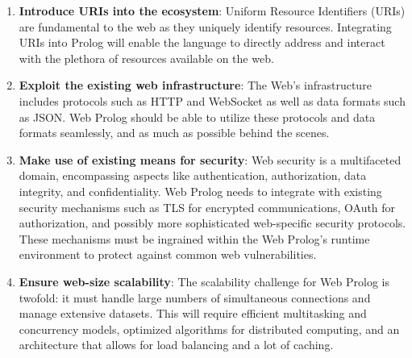 \begin{enumerate}
\def\labelenumi{\arabic{enumi}.}
\item
  \textbf{Introduce URIs into the ecosystem}: Uniform Resource
  Identifiers (URIs) are fundamental to the web as they uniquely
  identify resources. Integrating URIs into Prolog will enable the
  language to directly address and interact with the plethora of
  resources available on the web. 
\item
  \textbf{Exploit the existing web infrastructure}: The Web's infrastructure includes protocols such as HTTP and WebSocket as well as data formats such as JSON. Web Prolog should be able to utilize these protocols and data formats seamlessly, and as much as possible behind the scenes.
\item
  \textbf{Make use of existing means for security}: Web security is a
  multifaceted domain, encompassing aspects like authentication,
  authorization, data integrity, and confidentiality. Web Prolog needs
  to integrate with existing security mechanisms such as TLS for
  encrypted communications, OAuth for authorization, and possibly more
  sophisticated web-specific security protocols. These mechanisms must
  be ingrained within the Web Prolog's runtime environment to protect
  against common web vulnerabilities.
\item
  \textbf{Ensure web-size scalability}: The scalability challenge for
  Web Prolog is twofold: it must handle large numbers of simultaneous
  connections and manage extensive datasets. This will require efficient multitasking and concurrency
  models, optimized algorithms for distributed computing, and an
  architecture that allows for load balancing and a lot of caching.


\end{enumerate}
